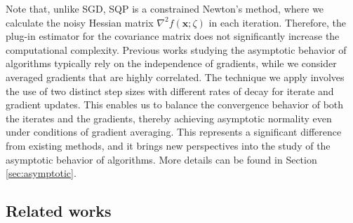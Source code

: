 \documentclass[aos]{imsart}
\numberwithin{equation}{section}
\theoremstyle{plain}
\begin{document}
Note that, unlike SGD, SQP is a constrained Newton's method, where we calculate the noisy Hessian matrix $\nabla^2 f(\bm{x};\zeta)$ in each iteration. Therefore, the plug-in estimator for the covariance matrix does not significantly increase the computational complexity. 
Previous works studying the asymptotic behavior of algorithms typically rely on the independence of gradients, while we consider averaged gradients that are highly correlated.
The technique we apply involves the use of two distinct step sizes with different rates of decay for iterate and gradient updates. This enables us to balance the convergence behavior of both the iterates and the gradients, thereby achieving asymptotic normality even under conditions of gradient averaging.
This represents a significant difference from existing methods, and it brings new perspectives into the study of the asymptotic behavior of algorithms. More details can be found in Section \ref{sec:asymptotic}.



\subsection{Related works}
\label{intro:related_works}
\end{document}
